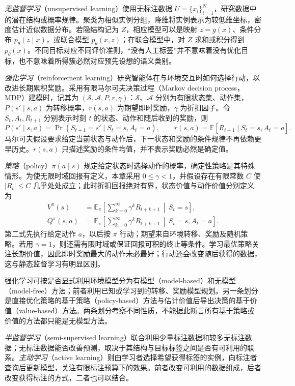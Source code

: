 \emph{无监督学习}（unsupervised learning）使用无标注数据 $U=\{x_i\}_{i=1}^N$，研究数据中的潜在结构或概率规律。聚类为相似实例分组，降维将实例表示为较低维坐标，密度估计近似数据分布。若隐结构记为 $Z$，相应模型可以是映射 $z=g(x)$、条件分布 $p_\theta(z\mid x)$，或联合模型 $p_\theta(x,z)$；在联合模型中，对 $Z$ 求和或积分得到 $p_\theta(x)$。不同目标对应不同评价准则，“没有人工标签”并不意味着没有优化目标，也不意味着所得簇必然对应预先设想的语义类别。

\emph{强化学习}（reinforcement learning）研究智能体在与环境交互时如何选择行动，以改进长期累积奖励。采用有限马尔可夫决策过程（Markov decision process，MDP）建模时，记其为 $(\mathcal S,\mathcal A,P,r,\gamma)$：$\mathcal S$、$\mathcal A$ 分别为有限状态集、动作集，$P(s'\mid s,a)$ 为转移概率，$r(s,a)$ 为期望即时奖励，$\gamma$ 为折扣因子。令 $S_t,A_t,R_{t+1}$ 分别表示时刻 $t$ 的状态、动作和随后收到的奖励，则
\[
    P(s'\mid s,a)=\Pr(S_{t+1}=s'\mid S_t=s,A_t=a),
    \qquad
    r(s,a)=\mathbb E[R_{t+1}\mid S_t=s,A_t=a].
\]
马尔可夫假设要求给定当前状态与动作后，下一状态和奖励的条件规律不再依赖更早历史。$r(s,a)$ 只描述奖励的条件均值，并不表示奖励必然是确定值。

\emph{策略}（policy）$\pi(a\mid s)$ 规定给定状态时选择动作的概率，确定性策略是其特殊情形。为使无限时域回报有定义，本章采用 $0\leq\gamma<1$，并假设存在有限常数 $C$ 使 $|R_t|\leq C$ 几乎处处成立；此时折扣回报绝对有界，状态价值与动作价值分别定义为
\begin{align}
    V^\pi(s)
    &=\mathbb E_\pi\!\left[\sum_{k=0}^\infty\gamma^kR_{t+k+1}
      \,\middle|\,S_t=s\right],
      \label{eq:lh-state-value}\\
    Q^\pi(s,a)
    &=\mathbb E_\pi\!\left[\sum_{k=0}^\infty\gamma^kR_{t+k+1}
      \,\middle|\,S_t=s,A_t=a\right].
      \label{eq:lh-action-value}
\end{align}
第二式先执行给定动作 $a$，以后按 $\pi$ 行动；期望来自环境转移、奖励及随机策略。若用 $\gamma=1$，则还需有限时域或保证回报可积的终止等条件。学习最优策略关注长期价值，因此即时奖励最大的动作未必最好；行动还会改变随后获得的数据，这与静态监督学习有明显区别。

强化学习可按是否显式利用环境模型分为有模型（model-based）和无模型（model-free）方法；前者利用已知或学习到的转移、奖励模型规划。另一条划分是直接优化策略的基于策略（policy-based）方法与估计价值后导出决策的基于价值（value-based）方法。两条划分考察不同性质，不能据此断言所有基于策略或价值的方法都只能是无模型方法。

\emph{半监督学习}（semi-supervised learning）联合利用少量标注数据和较多无标注数据；无标注数据能否改善预测，取决于其结构与目标标签之间是否有可利用的联系。\emph{主动学习}（active learning）则由学习者选择希望获得标签的实例，向标注者查询后更新模型，关注有限标注预算下的效果。前者改变可利用的数据组成，后者改变获得标注的方式，二者也可以结合。

